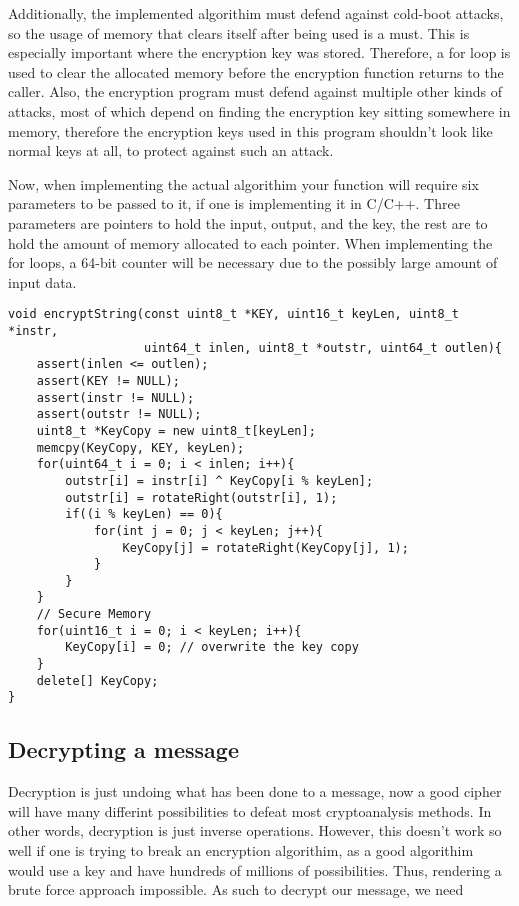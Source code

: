 \documentclass[12pt]{article}
\begin{document}
    Additionally, the implemented algorithim must defend against cold-boot
    attacks, so the usage of memory that clears itself after being used
    is a must. This is especially important where the encryption key
    was stored. Therefore, a for loop is used to clear the allocated
    memory before the encryption function returns to the caller. 
    Also, the encryption program must defend against multiple other 
    kinds of attacks, most of which depend on finding the encryption 
    key sitting somewhere in memory, therefore the encryption keys 
    used in this program shouldn't look like normal keys at all, 
    to protect against such an attack.
    
    Now, when implementing the actual algorithim your function will
    require six parameters to be passed to it, if one is implementing 
    it in C/C++. Three parameters are pointers to hold the input, 
    output, and the key, the rest are to hold the amount of memory
    allocated to each pointer. When implementing the for loops, 
    a 64-bit counter will be necessary due to the possibly large
    amount of input data.

    \singlespacing
    \begin{lstlisting}[caption=C++ Encryption Source Code]
void encryptString(const uint8_t *KEY, uint16_t keyLen, uint8_t *instr,
                   uint64_t inlen, uint8_t *outstr, uint64_t outlen){
    assert(inlen <= outlen);
    assert(KEY != NULL);
    assert(instr != NULL);
    assert(outstr != NULL);
    uint8_t *KeyCopy = new uint8_t[keyLen];
    memcpy(KeyCopy, KEY, keyLen);
    for(uint64_t i = 0; i < inlen; i++){
        outstr[i] = instr[i] ^ KeyCopy[i % keyLen];
        outstr[i] = rotateRight(outstr[i], 1);
        if((i % keyLen) == 0){
            for(int j = 0; j < keyLen; j++){
                KeyCopy[j] = rotateRight(KeyCopy[j], 1);
            }
        }
    }
    // Secure Memory
    for(uint16_t i = 0; i < keyLen; i++){
        KeyCopy[i] = 0; // overwrite the key copy
    }
    delete[] KeyCopy;
}
    \end{lstlisting}

    

\doublespacing
\subsection{Decrypting a message}
    Decryption is just undoing what has been done to a message, now a
    good cipher will have many differint possibilities to defeat most
    cryptoanalysis methods. In other words, decryption is just inverse
    operations. However, this doesn't work so well if one is trying to
    break an encryption algorithim, as  a good algorithim would use a
    key and have hundreds of millions of possibilities. Thus, rendering
    a brute force approach impossible. As such to decrypt our message,
    we need 
\end{document}
